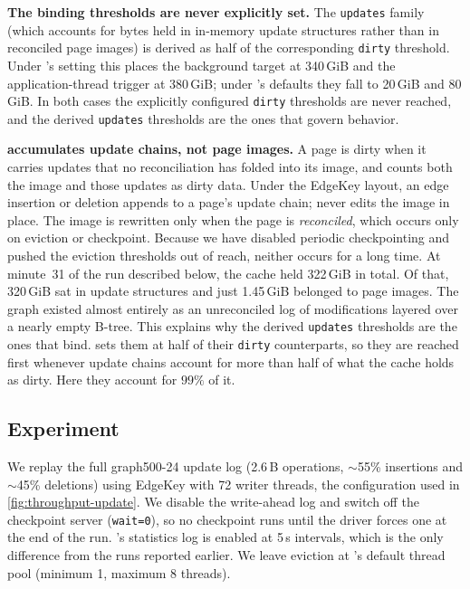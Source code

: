 \textbf{The binding thresholds are never explicitly set.} The
\texttt{updates} family (which accounts for bytes held in in-memory update structures rather than in reconciled page images) is derived as half of the corresponding \texttt{dirty} threshold.
Under \project{}'s setting this places the background target at 340\,GiB and the application-thread trigger at 380\,GiB; under \wt{}'s defaults they fall to 20\,GiB and 80\,GiB.
In both cases the explicitly configured \texttt{dirty} thresholds are never reached, and the derived \texttt{updates} thresholds are the ones that govern behavior.

\textbf{\project{} accumulates update chains, not page images.} A page is dirty when it carries updates that no reconciliation has folded into its image, and \wt{} counts both the image and those updates as dirty data.
Under the EdgeKey layout, an edge insertion or deletion appends to a page's update chain; \wt{} never edits the image in place.
The image is rewritten only when the page is \emph{reconciled}, which occurs only on eviction or checkpoint.
Because we have disabled periodic checkpointing and pushed the eviction thresholds out of reach, neither occurs for a long time.
At minute~31 of the run described below, the cache held 322\,GiB in total.
Of that, 320\,GiB sat in update structures and just 1.45\,GiB belonged to page images.
The graph existed almost entirely as an unreconciled log of modifications layered over a nearly empty B-tree.
This explains why the derived \texttt{updates} thresholds are the ones that bind.
\wt{} sets them at half of their \texttt{dirty} counterparts, so they are reached first whenever update chains account for more than half of what the cache holds as dirty.
Here they account for $99\%$ of it.

\subsection{Experiment}
\label{sec:eval:dynamic:dirty:setup}

We replay the full graph500-24 update log (2.6\,B operations, ${\sim}$55\% insertions and ${\sim}$45\% deletions) using \project{} EdgeKey with 72 writer threads, the configuration used in \autoref{fig:throughput-update}. 
We disable the write-ahead log and switch off the checkpoint server \mbox{(\texttt{wait=0})}, so no checkpoint runs until the driver forces one at the end of the run.
\wt{}'s statistics log is enabled at 5\,s intervals, which is the only difference from the runs reported earlier.
We leave eviction at \wt{}'s default thread pool (minimum 1, maximum 8 threads).

